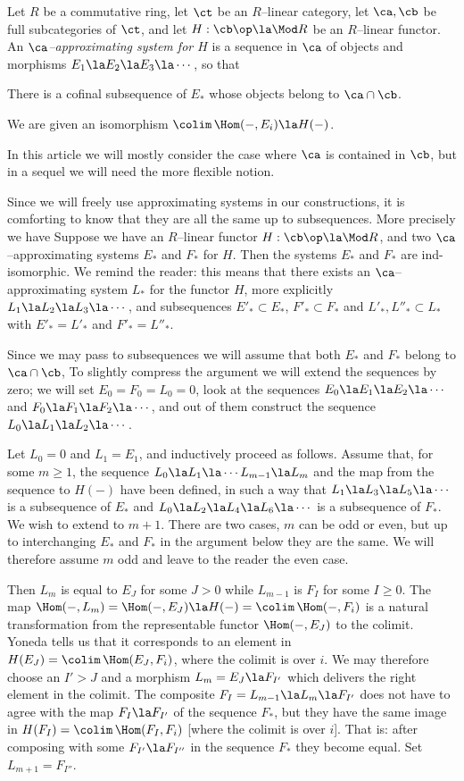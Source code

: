 \documentclass[11pt]{amsart}
\begin{document}
Let $R$ be a commutative ring, let $\ct$ be an
$R$--linear category, let $\ca,\cb$ be full subcategories of
$\ct$, and let $H:\cb\op\la\Mod R$ be
an $R$--linear functor.
An \emph{$\ca$--approximating system for $H$}
is a sequence in
$\ca$ of  objects and morphisms $E_1\la E_2\la E_3\la\cdots$,
so that
\be
\item
There is a cofinal subsequence of $E_*$ whose objects belong to
$\ca\cap\cb$.
\item
We are given an isomorphism $\colim\,\Hom(-,E_i)\la H(-)$.
\ee
\edfn

\nin
In this article we will mostly consider the case where $\ca$ is contained
in $\cb$, but in a sequel we will need the more flexible notion.

Since we will freely use approximating systems in our
constructions,
it is comforting to know that they are all the same
up to subsequences. More precisely we have
Suppose we have an $R$--linear functor $H:\cb\op\la\Mod R$,
and two $\ca$--approximating  systems $E_*$ and $F_*$ for $H$. Then the
systems $E_*$ and $F_*$ are ind-isomorphic. We remind the reader: this means
that 
there exists an $\ca$--approximating system $L_*$ for the functor $H$,
more explicitly 
 $L_1\la L_2\la L_3\la\cdots$, and subsequences $E'_*\subset E_*$, $F'_*\subset F_*$ and $L'_*,L''_*\subset L_*$ with
$E'_*=L'_*$ and $F'_*=L''_*$.
\elem

\prf
Since we may pass to subsequences we will assume that both $E_*$ and $F_*$
belong to $\ca\cap\cb$,
To slightly compress the argument we will extend the sequences by zero;
we will set $E_0=F_0=L_0=0$,
look at the sequences
$E_0\la E_1\la E_2\la\cdots$ and
$F_0\la F_1\la F_2\la\cdots$,
and out of them construct the sequence $L_0\la L_1\la L_2\la\cdots$.

Let $L_0=0$ and $L_1=E_1$, and inductively proceed as follows.
Assume that, for
some $m\geq 1$,
the sequence $L_0\la L_1\la\cdots L_{m-1}\la L_m$ and the map
from the sequence to $H(-)$ have been defined,
in such a way that $L_1\la L_3\la L_5\la\cdots$ is a subsequence of $E_*$
and $L_0\la L_2\la L_4\la L_6\la\cdots$ is a subsequence of $F_*$.
We wish to
extend to $m+1$. There are two cases, $m$ can be odd or even, but up to
interchanging $E_*$ and $F_*$
in the argument below they are the same. We will therefore
assume $m$ odd and leave to the reader the even case.

Then $L_m$ is equal to $E_J$ for some $J>0$ while $L_{m-1}$ is 
$F_{I}$ for some $I\geq0$.
The map
$\Hom(-,L_m)=\Hom(-,E_J)\la H(-)=\colim\,\Hom(-,F_i)$
is a natural transformation from the representable functor
$\Hom(-,E_J)$ to the colimit. Yoneda tells us that
it corresponds to an element in $H(E_J)=\colim\,\Hom(E_J,F_i)$,
where the colimit is over $i$. We may therefore choose an $I'>J$
and a morphism $L_m=E_J\la F_{I'}$ which delivers the right
element in
the colimit. The composite $F_{I}=L_{m-1}\la L_m\la F_{I'}$
does not have to agree with the map $F_{I}\la F_{I'}$ of the
sequence $F_*$, but they have the same image in
$H(F_I)=\colim\,\Hom(F_{I},F_{i})$
[where the colimit is over $i$].
That is: after
composing with some $F_{I'}\la F_{I''}$ in the sequence $F_*$ they become
equal.
Set $L_{m+1}=F_{I''}$.
\eprf
\end{document}
